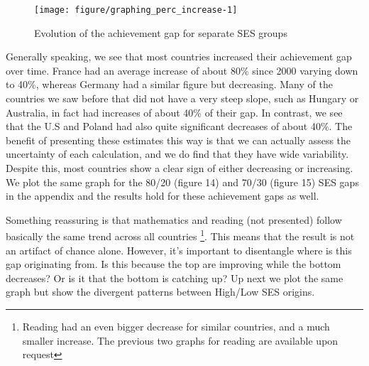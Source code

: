 \documentclass[11pt, a4paper]{article}\usepackage[]{graphicx}\usepackage[]{color}
\begin{document}


\begin{figure}

{\centering \texttt{[image: figure/graphing\_perc\_increase-1]} 

}

\caption[Evolution of the achievement gap for separate SES groups]{Evolution of the achievement gap for separate SES groups}\label{fig:graphing_perc_increase}
\end{figure}



Generally speaking, we see that most countries increased their achievement gap over time. France had an average increase of about 80\% since 2000 varying down to 40\%, whereas Germany had a similar figure but decreasing. Many of the countries we saw before that did not have a very steep slope, such as Hungary or Australia, in fact had increases of about 40\% of their gap. In contrast, we see that the U.S and Poland had also quite significant decreases of about 40\%. The benefit of presenting these estimates this way is that we can actually assess the uncertainty of each calculation, and we do find that they have wide variability. Despite this, most countries show a clear sign of either decreasing or increasing. We plot the same graph for the 80/20 (figure 14) and 70/30 (figure 15) SES gaps in the appendix and the results hold for these achievement gaps as well.



Something reassuring is that mathematics and reading (not presented) follow basically the same trend across all countries \footnote{Reading had an even bigger decrease for similar countries, and a much smaller increase. The previous two graphs for reading are available upon request}. This means that the result is not an artifact of chance alone. However, it's important to disentangle where is this gap originating from. Is this because the top are improving while the bottom decreases? Or is it that the bottom is catching up? Up next we plot the same graph but show the divergent patterns between High/Low SES origins.
\end{document}
